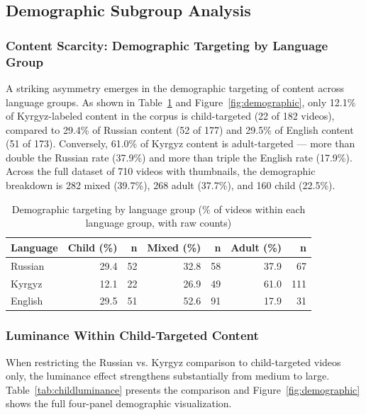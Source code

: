 \documentclass[12pt, letterpaper]{article}
\begin{document}
\subsection{Demographic Subgroup Analysis}

\subsubsection{Content Scarcity: Demographic Targeting by Language Group}

A striking asymmetry emerges in the demographic targeting of content across language groups. As shown in Table~\ref{tab:demographic} and Figure~\ref{fig:demographic}, only 12.1\% of Kyrgyz-labeled content in the corpus is child-targeted (22 of 182 videos), compared to 29.4\% of Russian content (52 of 177) and 29.5\% of English content (51 of 173). Conversely, 61.0\% of Kyrgyz content is adult-targeted — more than double the Russian rate (37.9\%) and more than triple the English rate (17.9\%). Across the full dataset of 710 videos with thumbnails, the demographic breakdown is 282 mixed (39.7\%), 268 adult (37.7\%), and 160 child (22.5\%).

\begin{table}[H]
\centering
\caption{Demographic targeting by language group (\% of videos within each language group, with raw counts)}
\label{tab:demographic}
\begin{tabular}{lrrrrrr}
\toprule
\textbf{Language} & \textbf{Child (\%)} & \textbf{n} & \textbf{Mixed (\%)} & \textbf{n} & \textbf{Adult (\%)} & \textbf{n} \\
\midrule
Russian  & 29.4 & 52  & 32.8 & 58  & 37.9 & 67  \\
Kyrgyz   & 12.1 & 22  & 26.9 & 49  & 61.0 & 111 \\
English  & 29.5 & 51  & 52.6 & 91  & 17.9 & 31  \\
\bottomrule
\end{tabular}
\end{table}

\subsubsection{Luminance Within Child-Targeted Content}

When restricting the Russian vs. Kyrgyz comparison to child-targeted videos only, the luminance effect strengthens substantially from medium to large. Table~\ref{tab:childluminance} presents the comparison and Figure~\ref{fig:demographic} shows the full four-panel demographic visualization.
\end{document}
